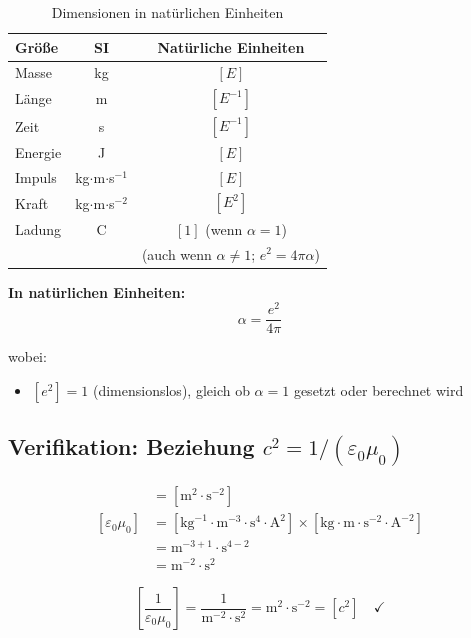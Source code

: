 	\begin{table}[h]
		\centering
		\begin{tabular}{|l|c|c|}
			\hline
			\textbf{Größe} & \textbf{SI} & \textbf{Natürliche Einheiten} \\
			\hline
			Masse & kg & $[E]$ \\
			Länge & m & $[E^{-1}]$ \\
			Zeit & s & $[E^{-1}]$ \\
			Energie & J & $[E]$ \\
			Impuls & kg$\cdot$m$\cdot$s$^{-1}$ & $[E]$ \\
			Kraft & kg$\cdot$m$\cdot$s$^{-2}$ & $[E^2]$ \\
			Ladung & C & $[1]$ (wenn $\alpha = 1$) \\
			& & (auch wenn $\alpha \neq 1$; $e^2 = 4\pi\alpha$) \\
			\hline
		\end{tabular}
		\caption{Dimensionen in natürlichen Einheiten}
	\end{table}
	
	\textbf{In natürlichen Einheiten:}
	\begin{equation}
		\alpha = \frac{e^2}{4\pi}
	\end{equation}
	
	wobei:
	\begin{itemize}
		\item $[e^2] = 1$ (dimensionslos), gleich ob $\alpha = 1$ gesetzt oder berechnet wird
	\end{itemize}
	
	\subsection[Verifikation: Beziehung c quadrat]{Verifikation: Beziehung $c^2 = 1/(\varepsilon_0\mu_0)$}
	
	\begin{align}
		[c^2] &= [\text{m}^2\cdot\text{s}^{-2}] \\
		[\varepsilon_0\mu_0] &= [\text{kg}^{-1}\cdot\text{m}^{-3}\cdot\text{s}^4\cdot\text{A}^2] \times [\text{kg}\cdot\text{m}\cdot\text{s}^{-2}\cdot\text{A}^{-2}] \\
		&= \text{m}^{-3+1}\cdot\text{s}^{4-2} \\
		&= \text{m}^{-2}\cdot\text{s}^2
	\end{align}
	
	\begin{equation}
		\left[\frac{1}{\varepsilon_0\mu_0}\right] = \frac{1}{\text{m}^{-2}\cdot\text{s}^2} = \text{m}^2\cdot\text{s}^{-2} = [c^2] \quad \checkmark
	\end{equation}
	
